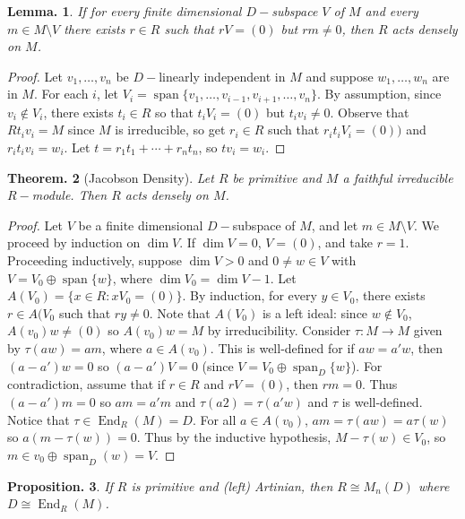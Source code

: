 \documentclass[11pt, a4paper]{memoir}
\theoremstyle{change}
\newtheorem{theorem}{Theorem.}[section]
\newtheorem{lemma}[theorem]{Lemma.}
\newtheorem{proposition}[theorem]{Proposition.}
\theoremstyle{plain}
\theoremstyle{nonumberplain}
\newtheorem{proof}{Proof}
\DeclareMathOperator{\End}{End}
\DeclareMathOperator{\spn}{span}
\numberwithin{equation}{section}
\begin{document}
\begin{lemma}
    If for every finite dimensional $D-$subspace $V$ of $M$ and every $m\in M\setminus V$ there exists $r\in R$ such that $rV=(0)$ but $rm\neq 0$, then $R$ acts densely on $M$.
\end{lemma}
\begin{proof}
    Let $v_1,\ldots,v_n$ be $D-$linearly independent in $M$ and suppose $w_1,\ldots,w_n$ are in $M$.
    For each $i$, let $V_i=\spn\{v_1,\ldots,v_{i-1},v_{i+1},\ldots,v_n\}$.
    By assumption, since $v_i\notin V_i$, there exists $t_i\in R$ so that $t_iV_i=(0)$ but $t_iv_i\neq 0$.
    Observe that $Rt_iv_i=M$ since $M$ is irreducible, so get $r_i\in R$ such that $r_it_iV_i=(0))$ and $r_it_iv_i=w_i$.
    Let $t=r_1t_1+\cdots+r_nt_n$, so $tv_i=w_i$.
\end{proof}
\begin{theorem}[Jacobson Density]
    Let $R$ be primitive and $M$ a faithful irreducible $R-$module.
    Then $R$ acts densely on $M$.
\end{theorem}
\begin{proof}
    Let $V$ be a finite dimensional $D-$subspace of $M$, and let $m\in M\setminus V$.
    We proceed by induction on $\dim V$.
    If $\dim V=0$, $V=(0)$, and take $r=1$.
    Proceeding inductively, suppose $\dim V>0$ and $0\neq w\in V$ with $V=V_0\oplus\spn\{w\}$, where $\dim V_0=\dim V-1$.
    Let $A(V_0)=\{x\in R:xV_0=(0)\}$.
    By induction, for every $y\in V_0$, there exists $r\in A(V_0$ such that $ry\neq 0$.
    Note that $A(V_0)$ is a left ideal: since $w\notin V_0$, $A(v_0)w\neq(0)$ so $A(v_0)w=M$ by irreducibility.
    Consider $\tau:M\to M$ given by $\tau(aw)=am$, where $a\in A(v_0)$.
    This is well-defined for if $aw=a'w$, then $(a-a')w=0$ so $(a-a')V=0$ (since $V=V_0\oplus\spn_D\{w\}$).
    For contradiction, assume that if $r\in R$ and $rV=(0)$, then $rm=0$.
    Thus $(a-a')m=0$ so $am=a'm$ and $\tau(a2)=\tau(a'w)$ and $\tau$ is well-defined.
    Notice that $\tau\in\End_R(M)=D$.
    For all $a\in A(v_0)$, $am=\tau(aw)=a\tau(w)$ so $a(m-\tau(w))=0$.
    Thus by the inductive hypothesis, $M-\tau(w)\in V_0$, so $m\in v_0\oplus\spn_D(w)=V$.
\end{proof}
\begin{proposition}
    If $R$ is primitive and (left) Artinian, then $R\cong M_n(D)$ where $D\cong\End_R(M)$.
\end{proposition}
\end{document}
